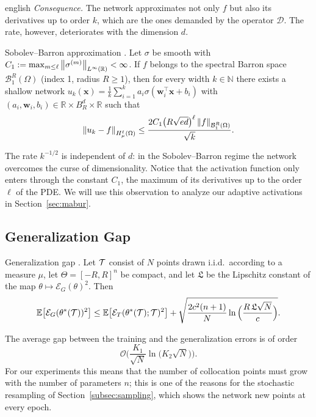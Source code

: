 \documentclass[0000.tex]{subfiles}
\begin{document}
\begin{hyphenrules}{english}
\emph{Consequence.} The network approximates not only $f$ but also its derivatives up to order $k$, which
are the ones demanded by the operator $\mathcal{D}$. The rate, however, deteriorates with the dimension
$d$.

\begin{teorema}{Sobolev--Barron approximation \cite[Theorem~4.33]{deryck2024acta}.}\label{thm:barron}
Let $\sigma$ be smooth with $C_1:=\max_{m\le\ell}\left\lVert \sigma^{(m)} \right\rVert_{L^\infty(\mathbb{R})}<\infty$. If $f$
belongs to the spectral Barron space $\mathcal{B}^{R}_{1}(\Omega)$ (index 1, radius $R\ge1$), then for
every width $k\in\mathbb{N}$ there exists a shallow network
$u_k(\mathbf{x})=\frac1k\sum_{i=1}^{k}a_i\sigma(\mathbf{w}_i^{\top}\mathbf{x}+b_i)$ with
$(a_i,\mathbf{w}_i,b_i)\in\mathbb{R}\times B^d_R\times\mathbb{R}$ such that
\[
  \left\lVert u_k-f \right\rVert_{H^{\ell}_{\mu}(\Omega)}\le\frac{2C_1\big(R\sqrt{ed}\big)^{\ell}\left\lVert f \right\rVert_{\mathcal{B}^R_1(\Omega)}}{\sqrt{k}}.
\]
\end{teorema}

The rate $k^{-1/2}$ is independent of $d$: in the Sobolev--Barron regime the network overcomes the
curse of dimensionality. Notice that the activation function only enters through the constant $C_1$,
the maximum of its derivatives up to the order $\ell$ of the PDE. We will use this observation to
analyze our adaptive activations in Section~\ref{sec:mabur}.

\subsection{Generalization Gap}

\begin{teorema}{Generalization gap \cite[Theorem~6.2]{deryck2022kolmogorov,beck2022}.}\label{thm:generalization}
Let $\mathcal{T}$ consist of $N$ points drawn i.i.d.\ according to a measure $\mu$, let $\Theta=[-R,R]^{n}$ be
compact, and let $\mathfrak{L}$ be the Lipschitz constant of the map $\theta\mapsto\mathcal{E}_G(\theta)^2$.
Then
\[
  \mathbb{E}\big[\mathcal{E}_G(\theta^{*}(\mathcal{T}))^2\big]\le\mathbb{E}\big[\mathcal{E}_T(\theta^{*}(\mathcal{T});\mathcal{T})^2\big]
  +\sqrt{\frac{2c^2(n+1)}{N}\ln\Big(\frac{R\,\mathfrak{L}\sqrt{N}}{c}\Big)}.
\]
\end{teorema}

The average gap between the training and the generalization errors is of order
\[
  \mathcal{O}\Big(\frac{K_1}{\sqrt N}\ln\big(K_2\sqrt N\big)\Big).
\] For our experiments this means that the number
of collocation points must grow with the number of parameters $n$; this is one of the reasons for the
stochastic resampling of Section~\ref{subsec:sampling}, which shows the network new points at every epoch.


\end{hyphenrules}
\end{document}
